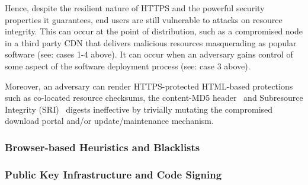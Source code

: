 Hence, despite the resilient nature of HTTPS and the powerful security
properties it guarantees, end users are still vulnerable to attacks on resource
integrity. This can occur at the point of distribution, such as a compromised
node in a third party CDN that delivers malicious resources masquerading as
popular software (see: cases 1-4 above). It can occur when an adversary gains
control of some aspect of the software deployment process (see: case 3 above).

Moreover, an adversary can render HTTPS-protected HTML-based protections such as
co-located resource checksums, the content-MD5 header~\cite{MD5Header} and
Subresource Integrity (SRI)~\cite{SRI} digests ineffective by trivially mutating
the compromised download portal and/or update/maintenance mechanism.

\subsubsection{Browser-based Heuristics and Blacklists}



\subsubsection{Public Key Infrastructure and Code Signing}

~\cite{DANE1, DANE2, DANE3, OpenPGP1}



